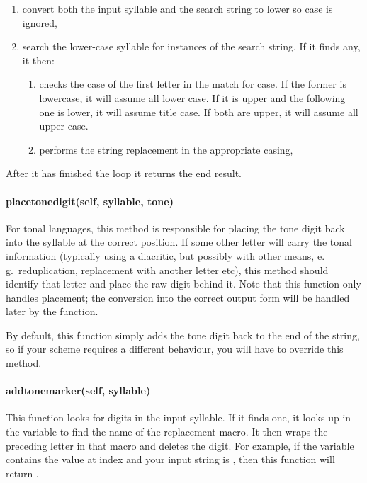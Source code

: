 \documentclass{ltxdockit}
\begin{document}
\begin{enumerate}
  \item convert both the input syllable and the search string to lower so case
    is ignored,
  \item search the lower-case syllable for instances of the search string. If it
    finds any, it then:
    \begin{enumerate}
      \item checks the case of the first letter in the match for case. If the
        former is lowercase, it will assume all lower case.  If it is upper and
        the following one is lower, it will assume title case. If both are
        upper, it will assume all upper case.
      \item performs the string replacement in the appropriate casing,
    \end{enumerate}
\end{enumerate}

After it has finished the loop it returns the end result.

\paragraph{place\textunderscore{}tone\textunderscore{}digit(self, syllable,
tone)}

For tonal languages, this method is responsible for placing the tone digit back
into the syllable at the correct position. If some other letter will carry the
tonal information (typically using a diacritic, but possibly with other means,
e.\,g.\ reduplication, replacement with another letter etc), this method should
identify that letter and place the raw digit behind it. Note that this function
only handles placement; the conversion into the correct output form will be
handled later by the 
function.

By default, this function simply adds the tone digit back to the end of the
string, so if your scheme requires a different behaviour, you will have to
override this method.

\paragraph{add\textunderscore{}tone\textunderscore{}marker(self, syllable)}

This function looks for digits in the input syllable. If it finds one, it looks
up in the  variable to find the name of the
replacement macro. It then wraps the preceding letter in that macro and deletes
the digit. For example, if the  variable
contains the value  at index  and your input string is
, then this function will return .
\end{document}
